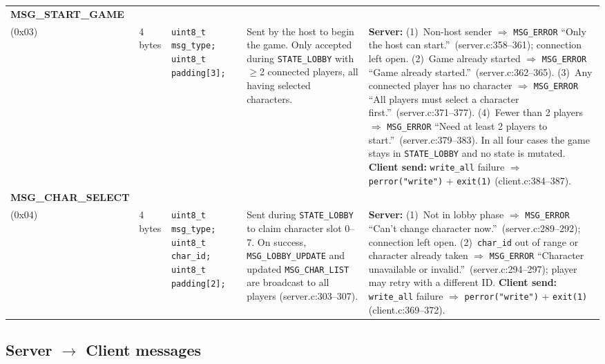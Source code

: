 \documentclass[11pt,letterpaper]{article}
\begin{document}
\begin{longtable}{@{}p{1.8cm} p{1.2cm} p{2.4cm} p{4.2cm} p{4.8cm}@{}}
\textbf{MSG\_START\_GAME}\\(0x03) &
4 bytes &
\texttt{uint8\_t msg\_type;}\newline
\texttt{uint8\_t padding[3];} &
Sent by the host to begin the game. Only accepted during \texttt{STATE\_LOBBY} with $\geq$2 connected players, all having selected characters. &
\textbf{Server:} (1)~Non-host sender $\Rightarrow$ \texttt{MSG\_ERROR} ``Only the host can start.''\ (server.c:358--361); connection left open. (2)~Game already started $\Rightarrow$ \texttt{MSG\_ERROR} ``Game already started.''\ (server.c:362--365). (3)~Any connected player has no character $\Rightarrow$ \texttt{MSG\_ERROR} ``All players must select a character first.''\ (server.c:371--377). (4)~Fewer than 2 players $\Rightarrow$ \texttt{MSG\_ERROR} ``Need at least 2 players to start.''\ (server.c:379--383). In all four cases the game stays in \texttt{STATE\_LOBBY} and no state is mutated. \textbf{Client send:} \texttt{write\_all} failure $\Rightarrow$ \texttt{perror("write")} + \texttt{exit(1)} (client.c:384--387). \\[4pt]

\textbf{MSG\_CHAR\_SELECT}\\(0x04) &
4 bytes &
\texttt{uint8\_t msg\_type;}\newline
\texttt{uint8\_t char\_id;}\newline
\texttt{uint8\_t padding[2];} &
Sent during \texttt{STATE\_LOBBY} to claim character slot 0--7. On success, \texttt{MSG\_LOBBY\_UPDATE} and updated \texttt{MSG\_CHAR\_LIST} are broadcast to all players (server.c:303--307). &
\textbf{Server:} (1)~Not in lobby phase $\Rightarrow$ \texttt{MSG\_ERROR} ``Can't change character now.''\ (server.c:289--292); connection left open. (2)~\texttt{char\_id} out of range or character already taken $\Rightarrow$ \texttt{MSG\_ERROR} ``Character unavailable or invalid.''\ (server.c:294--297); player may retry with a different ID. \textbf{Client send:} \texttt{write\_all} failure $\Rightarrow$ \texttt{perror("write")} + \texttt{exit(1)} (client.c:369--372). \\
\bottomrule
\end{longtable}
\endgroup

\subsection*{Server $\to$ Client messages}
\end{document}
